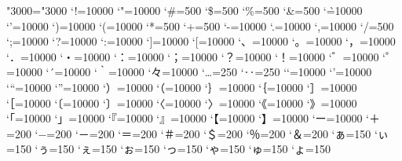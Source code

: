 \ifnum\ucs"3000="3000 \else
    \@@end
\fi
\prebreakpenalty`!=10000
\prebreakpenalty`"=10000
\postbreakpenalty`\#=500
\postbreakpenalty`\$=500
\prebreakpenalty`\%=500
\prebreakpenalty`\&=500
\postbreakpenalty`\`=10000
\prebreakpenalty`'=10000
\prebreakpenalty`)=10000
\postbreakpenalty`(=10000
\prebreakpenalty`*=500
\prebreakpenalty`+=500
\prebreakpenalty`-=10000
\prebreakpenalty`.=10000
\prebreakpenalty`,=10000
\prebreakpenalty`/=500
\prebreakpenalty`;=10000
\prebreakpenalty`?=10000
\prebreakpenalty`:=10000
\prebreakpenalty`]=10000
\postbreakpenalty`[=10000
\prebreakpenalty`、=10000
\prebreakpenalty`。=10000
\prebreakpenalty`，=10000
\prebreakpenalty`．=10000
\prebreakpenalty`・=10000
\prebreakpenalty`：=10000
\prebreakpenalty`；=10000
\prebreakpenalty`？=10000
\prebreakpenalty`！=10000
\prebreakpenalty`゛=10000%
\prebreakpenalty`゜=10000%
\prebreakpenalty`´=10000%
\postbreakpenalty`｀=10000%
\prebreakpenalty`々=10000%
\prebreakpenalty`…=250%
\prebreakpenalty`‥=250%
\postbreakpenalty`‘=10000%
\prebreakpenalty`’=10000%
\postbreakpenalty`“=10000%
\prebreakpenalty`”=10000%
\prebreakpenalty`）=10000
\postbreakpenalty`（=10000
\prebreakpenalty`｝=10000
\postbreakpenalty`｛=10000
\prebreakpenalty`］=10000
\postbreakpenalty`［=10000
\postbreakpenalty`〔=10000%
\prebreakpenalty`〕=10000%
\postbreakpenalty`〈=10000%
\prebreakpenalty`〉=10000%
\postbreakpenalty`《=10000%
\prebreakpenalty`》=10000%
\postbreakpenalty`「=10000%
\prebreakpenalty`」=10000%
\postbreakpenalty`『=10000%
\prebreakpenalty`』=10000%
\postbreakpenalty`【=10000%
\prebreakpenalty`】=10000%
\prebreakpenalty`ー=10000
\prebreakpenalty`＋=200
\prebreakpenalty`−=200%
\prebreakpenalty`－=200%
\prebreakpenalty`＝=200
\postbreakpenalty`＃=200
\postbreakpenalty`＄=200
\prebreakpenalty`％=200
\prebreakpenalty`＆=200
\prebreakpenalty`ぁ=150
\prebreakpenalty`ぃ=150
\prebreakpenalty`ぅ=150
\prebreakpenalty`ぇ=150
\prebreakpenalty`ぉ=150
\prebreakpenalty`っ=150
\prebreakpenalty`ゃ=150
\prebreakpenalty`ゅ=150
\prebreakpenalty`ょ=150
